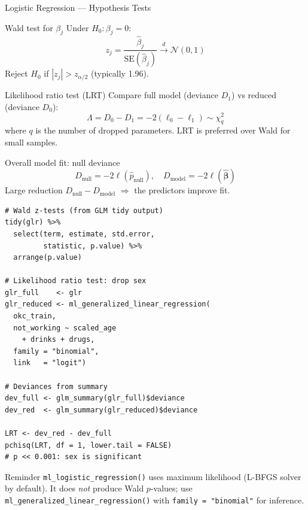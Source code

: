 \documentclass[11pt, aspectratio=169]{beamer}
\newcommand{\Rfun}[1]{\texttt{\textcolor{codekw}{#1}}}
\begin{document}
\begin{frame}{Logistic Regression --- Hypothesis Tests}
	\begin{block}{Wald test for $\beta_j$}
				Under $H_0: \beta_j = 0$:
				\[
				z_j = \frac{\hat\beta_j}{\mathrm{SE}(\hat\beta_j)}
				\xrightarrow{d} \mathcal{N}(0,1)
				\]
				Reject $H_0$ if $|z_j| > z_{\alpha/2}$ (typically 1.96).
			\end{block}
			\begin{block}{Likelihood ratio test (LRT)}
				Compare full model (deviance $D_1$) vs reduced (deviance $D_0$):
				\[
				\Lambda = D_0 - D_1 = -2(\ell_0 - \ell_1)
				\sim \chi^2_{q}
				\]
				where $q$ is the number of dropped parameters.
				LRT is preferred over Wald for small samples.
			\end{block}
			\begin{block}{Overall model fit: null deviance}
				\[
				D_{\text{null}} = -2\ell(\hat p_{\text{null}}),
				\quad
				D_{\text{model}} = -2\ell(\hat{\bm\beta})
				\]
				Large reduction $D_{\text{null}} - D_{\text{model}}$
				$\Rightarrow$ the predictors improve fit.
			\end{block}
		\begin{lstlisting}[title={Wald tests \& LRT via sparklyr}]
# Wald z-tests (from GLM tidy output)
tidy(glr) %>%
  select(term, estimate, std.error,
         statistic, p.value) %>%
  arrange(p.value)

# Likelihood ratio test: drop sex
glr_full    <- glr
glr_reduced <- ml_generalized_linear_regression(
  okc_train,
  not_working ~ scaled_age
    + drinks + drugs,
  family = "binomial",
  link   = "logit")

# Deviances from summary
dev_full <- glm_summary(glr_full)$deviance
dev_red  <- glm_summary(glr_reduced)$deviance

LRT <- dev_red - dev_full
pchisq(LRT, df = 1, lower.tail = FALSE)
# p << 0.001: sex is significant
			\end{lstlisting}
			\begin{alertblock}{Reminder}
				\Rfun{ml\_logistic\_regression()} uses maximum likelihood
				(L-BFGS solver by default).  It does \emph{not} produce
				Wald $p$-values; use \Rfun{ml\_generalized\_linear\_regression()}
				with \texttt{family = "binomial"} for inference.
			\end{alertblock}
		\end{frame}
\end{document}
